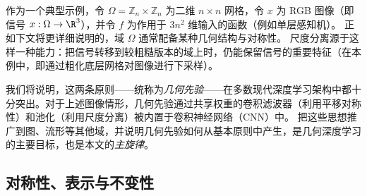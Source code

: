 
作为一个典型示例，令 $\Omega = \mathbb{Z}_n\times \mathbb{Z}_n$ 为二维 $n\times n$ 网格，令 $x$ 为 RGB 图像（即信号 $x : \Omega \rightarrow \R^3$），并令 $f$ 为作用于 $3n^2$ 维输入的函数（例如单层感知机）。
%
正如下文将更详细说明的，域 $\Omega$ 通常配备某种几何结构与对称性。%
%
尺度分离源于这样一种能力：把信号转移到较粗糙版本的域上时，仍能保留信号的重要特征（在本例中，即通过粗化底层网格对图像进行下采样）。


我们将说明，这两条原则——统称为{\em 几何先验}——在多数现代深度学习架构中都十分突出。对于上述图像情形，几何先验通过共享权重的卷积滤波器（利用平移对称性）和池化（利用尺度分离）被内置于卷积神经网络（CNN）中。
%
把这些思想推广到图、流形等其他域，并说明几何先验如何从基本原则中产生，是几何深度学习的主要目标，也是本文的{\em 主旋律}。



\subsection{对称性、表示与不变性}
\label{sec:symmetries}


